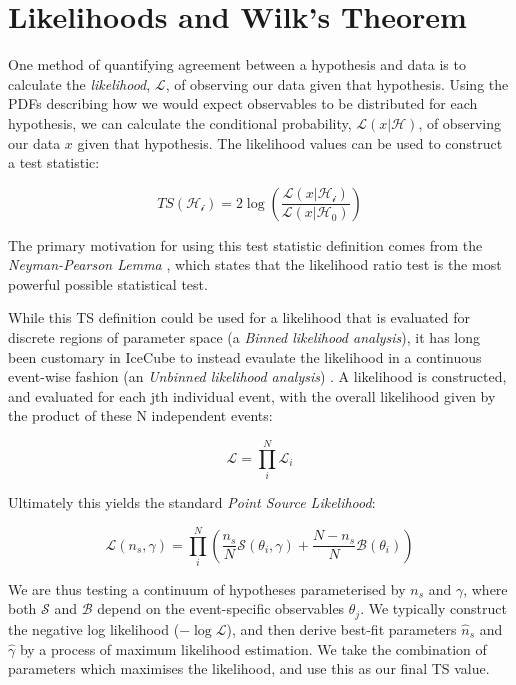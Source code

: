 \section{Likelihoods and Wilk's Theorem}

One method of quantifying agreement between a hypothesis and data is to calculate the \emph{likelihood}, $\mathcal{L}$, of observing our data given that hypothesis. Using the PDFs describing how we would expect observables to be distributed for each hypothesis, we can calculate the conditional probability, $\mathcal{L}(x | \mathcal{H})$, of observing our data $x$ given that hypothesis. The likelihood values can be used to construct a test statistic:

\begin{equation}
TS (\mathcal{H_{i}}) = 2 \log \left( \frac{\mathcal{L}(x | \mathcal{H_{i}})}{\mathcal{L}(x | \mathcal{H_{0}})} \right)
\label{eq:ts}
\end{equation}

The primary motivation for using this test statistic definition comes from the \emph{Neyman-Pearson Lemma} , which states that the likelihood ratio test is the most powerful possible statistical test. 

While this TS definition could be used for a likelihood that is evaluated for discrete regions of parameter space (a \emph{Binned likelihood analysis}), it has long been customary in IceCube to instead evaulate the likelihood in a continuous event-wise fashion (an \emph{Unbinned likelihood analysis}) . A likelihood is constructed, and evaluated for each jth individual event, with the overall likelihood given by the product of these N independent events:

\begin{equation}
	\mathcal{L} = \prod_{i}^{N} \mathcal{L}_{i}
\end{equation}

Ultimately this yields the standard \emph{Point Source Likelihood}:

\begin{equation}
	\mathcal{L}(n_{s}, \gamma) = \prod_{i}^{N} \left(\frac{n_{s}}{N} \mathcal{S}(\theta_{i}, \gamma) + \frac{N - n_{s}}{N} \mathcal{B}(\theta_{i})  \right)
\label{eq:ps_llh}
\end{equation}

We are thus testing a continuum of hypotheses parameterised by $n_{s}$ and $\gamma$, where both $\mathcal{S}$ and $\mathcal{B}$ depend on the event-specific observables $\theta_{j}$. We typically construct the negative log likelihood ($- \log\mathcal{L}$), and then derive best-fit parameters $\hat{n}_{s}$ and  $\hat{\gamma}$ by a process of maximum likelihood estimation. We take the combination of parameters which maximises the likelihood, and use this as our final TS value. 

